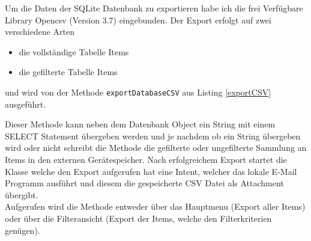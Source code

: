 Um die Daten der SQLite Datenbank zu exportieren habe ich die frei Verfügbare Library Opencsv (Version 3.7) eingebunden. Der Export erfolgt auf zwei verschiedene Arten

\begin{itemize}
	\item die vollständige Tabelle Items
	\item die gefilterte Tabelle Items
\end{itemize}

und wird von der Methode \texttt{exportDatabaseCSV} aus Listing \ref{exportCSV} ausgeführt.



Dieser Methode kann neben dem Datenbank Object ein String mit einem SELECT Statement übergeben werden und je nachdem ob ein String übergeben wird oder nicht schreibt die Methode die gefilterte oder ungefilterte Sammlung an Items in den externen Gerätespeicher. Nach erfolgreichem Export startet die Klasse welche den Export aufgerufen hat eine Intent, welcher das lokale E-Mail Programm ausführt und diesem die gespeicherte CSV Datei als Attachment übergibt.\\

Aufgerufen wird die Methode entweder über das Hauptmenu (Export aller Items) oder über die Filteransicht (Export der Items, welche den Filterkriterien genügen).